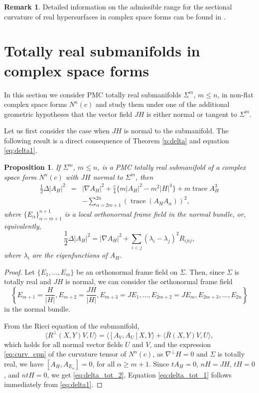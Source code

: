 \documentclass[11pt]{amsart}
\theoremstyle{plain}
\newtheorem{proposition}  [theorem]  {Proposition}
\theoremstyle{definition}
\newtheorem{remark}       [theorem]  {Remark}
\DeclareMathOperator{\trace}{trace} \DeclareMathOperator{\di}{div}
\numberwithin{equation}{section}
\begin{document}
\begin{remark} Detailed information on the admissible range for the sectional curvature of real hypersurfaces in complex space forms can be found in \cite{MTT}.
\end{remark}

\section{Totally real submanifolds in complex space forms}

In this section we consider PMC totally real submanifolds $\Sigma^m$, $m\leq n$, in non-flat complex space forms $N^n(c)$ and study them under one of the additional geometric hypotheses that the vector field $JH$ is either normal or tangent to $\Sigma^m$.

Let us first consider the case when $JH$ is normal to the submanifold. The following result is a direct consequence of Theorem \ref{p:delta} and equation \eqref{eq:delta1}.

\begin{proposition}\label{p:tot1} If $\Sigma^m$, $m\leq n$, is a PMC totally real submanifold of a complex space form $N^n(c)$ with $JH$ normal to $\Sigma^m$, then
\begin{eqnarray}\label{eq:delta_tot_2}
\frac{1}{2}\Delta|A_H|^2&=&|\nabla A_H|^2+\frac{c}{4}\{m|A_H|^2-m^2|H|^4\}+m\trace A_H^3\\\nonumber&&-\sum_{\alpha=2m+1}^{2n}(\trace(A_HA_{\alpha}))^2,
\end{eqnarray}
where $\{E_{\alpha}\}_{\alpha=m+1}^{n+1}$ is a local orthonormal frame field in the normal bundle, or, equivalently,
\begin{equation}\label{eq:delta_tot_1}
\frac{1}{2}\Delta|A_H|^2=|\nabla A_H|^2+\sum_{i<j}(\lambda_i-\lambda_j)^2R_{ijij},
\end{equation}
where $\lambda_i$ are the eigenfunctions of $A_H$.
\end{proposition}

\begin{proof} Let $\{E_1,\ldots,E_m\}$ be an orthonormal frame field on $\Sigma$. Then, since $\Sigma$ is totally real and $JH$ is normal, we can consider the orthonormal frame field 
$$
\left\{E_{m+1}=\frac{H}{|H|},E_{m+2}=\frac{JH}{|H|},E_{m+3}=JE_1,\ldots,E_{2m+2}=JE_m,E_{2m+3},\ldots,E_{2n}\right\}
$$ 
in the normal bundle. 

From the Ricci equation of the submanifold,
\begin{equation}\label{eq:ricci}
\langle R^{\perp}(X,Y)V,U\rangle=\langle[A_V,A_U]X,Y\rangle+\langle\bar R(X,Y)V,U\rangle,
\end{equation}
which holds for all normal vector fields $U$ and $V$, and the expression \eqref{eq:curv_cpn} of the curvature tensor of $N^n(c)$, as $\nabla^{\perp}H=0$ and $\Sigma$ is totally real, we have $[A_H,A_{E_{\alpha}}]=0$, for all $\alpha\geq m+1$. Since $tA_H=0$, $nH=JH$, $tH=0$, and $ntH=0$, we get \eqref{eq:delta_tot_2}. Equation \eqref{eq:delta_tot_1} follows immediately from \eqref{eq:delta1}.
\end{proof}
\end{document}
